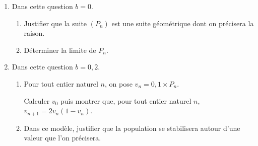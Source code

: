 \documentclass[10pt]{article}
\begin{document}
\medskip

\begin{enumerate}
\item Dans cette question $b  = 0$.
	\begin{enumerate}
		\item Justifier que la suite $\left(P_n\right)$ est une suite géométrique dont on précisera la raison.
		\item Déterminer la limite de $P_n$.
	\end{enumerate}
\item Dans cette question $b = 0,2$.
	\begin{enumerate}
		\item Pour tout entier naturel $n$, on pose $v_n = 0,1 \times P_n$.

Calculer $v_0$ puis montrer que, pour tout entier naturel $n$,\:$v_{n+1} = 2v_n\left(1 - v_n \right)$.
		\item Dans ce modèle, justifier que la population se stabilisera autour d'une valeur que l'on précisera.
	\end{enumerate}
\end{enumerate}
\end{document}
